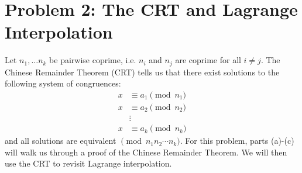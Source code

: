 \documentclass[11pt, notitlepage]{report}
\newcommand{\Question}[1]{\newpage\section{#1}}
\begin{document}
\Question{Problem 2: The CRT and Lagrange Interpolation}

Let $n_1, \ldots n_k$ be pairwise coprime, i.e. $n_i$ and $n_j$ are coprime for all $i \neq j$. The Chinese Remainder Theorem (CRT) tells us that there exist solutions to the following system of congruences:
\begin{align}
    x &\equiv a_1 \pmod{n_1} \tag{1} \\
    x &\equiv a_2 \pmod{n_2} \tag{2} \\
    &\vdots \tag{$\vdots$} \\
    x &\equiv a_k \pmod{n_k} \tag{$k$}
\end{align}
and all solutions are equivalent $\pmod{n_1 n_2 \cdots n_k}$. For this problem, parts (a)-(c) will walk us through a proof of the Chinese Remainder Theorem. 
We will then use the CRT to revisit Lagrange interpolation.
\end{document}

